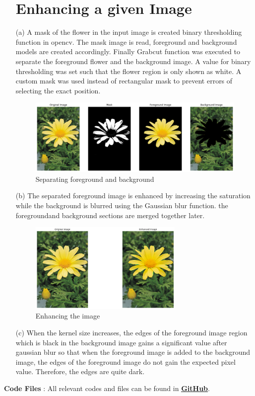 \documentclass[11pt]{article}
\begin{document}
\begin{flushleft}
\begin{itemize}
\section{Enhancing a given Image}
\item[(a)] A mask of the flower in the input image is created binary thresholding function in opencv. The mask image is read, foreground and background models are created accordingly. Finally Grabcut function was executed to separate the foreground flower and the background image. A value for binary thresholding was set such that the flower region is only shown as white. A custom mask was used instead of rectangular mask to prevent errors of selecting the exact position. 
    \begin{figure}[htp]
        \centering
        \includegraphics[width=1.\textwidth]{GrabCut.png}
        \caption{Separating foreground and background}
    \end{figure}
    \item[(b)] The separated foreground image is enhanced by increasing the saturation while the background is blurred using the Gaussian blur function. the foregroundand background sections are merged together later. 
    \begin{figure}[htp]
        \centering
        \includegraphics[width=0.7\textwidth]{Enhancement.png}
        \caption{Enhancing the image}
    \end{figure}
    \item[(c)] When the kernel size increases, the edges of the foreground image region which is black in the background image gains a significant value after gaussian blur so that when the foreground image is added to the background image, the edges of the foreground image do not gain the expected pixel value. Therefore, the edges are quite dark.
\end{itemize}
\textbf{Code Files} : All relevant codes and files can be found in \href{https://github.com/K-Thanushan/EN2550-Fundamentals-of-Image-Processing-and-Machine-Vision/tree/main/Assignments/Assignment1}{\textbf{\underline{GitHub}}}.

\end{flushleft}
\end{document}
